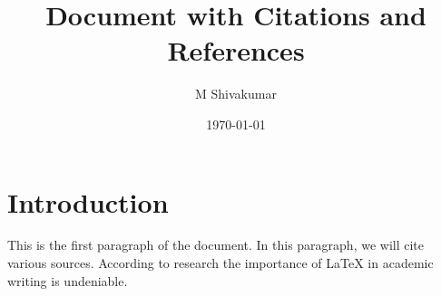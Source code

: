 \documentclass[a4paper,12pt]{article}
\title{Document with Citations and References}
\author{M Shivakumar}  %
\date{\today}
\begin{document}
 
\maketitle 
\section*{Introduction} 
This is the first paragraph of the document. In this paragraph, we will cite various sources. 
According to research the importance of LaTeX in academic writing is 
undeniable. 
\lipsum[1-2]
\cite{author1,author2,author3,author4,author5,author6,author7,author8,author9,author10}

\printbibliography%
\end{document}
